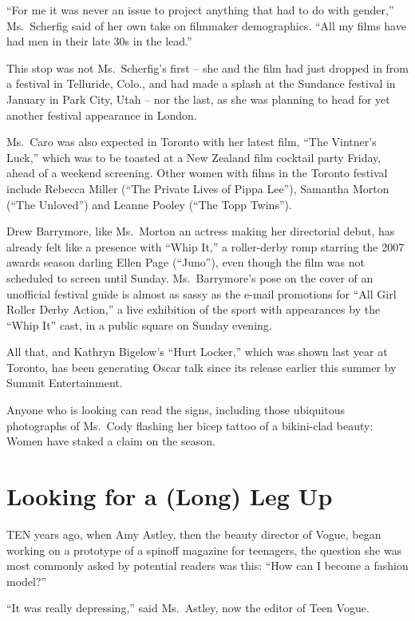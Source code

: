 ﻿\documentclass[12pt]{article}
\begin{document}
``For me it was never an issue to project anything that had to do with gender,'' Ms.~Scherfig said
of her own take on filmmaker demographics. ``All my films have had men in their late 30s in the
lead.''

This stop was not Ms.~Scherfig's first -- she and the film had just dropped in from a festival in
Telluride, Colo., and had made a splash at the Sundance festival in January in Park City, Utah --
nor the last, as she was planning to head for yet another festival appearance in London.

Ms.~Caro was also expected in Toronto with her latest film, ``The Vintner's Luck,'' which was to be
toasted at a New Zealand film cocktail party Friday, ahead of a weekend screening. Other women with
films in the Toronto festival include Rebecca Miller (``The Private Lives of Pippa Lee''), Samantha
Morton (``The Unloved'') and Leanne Pooley (``The Topp Twins'').

Drew Barrymore, like Ms.~Morton an actress making her directorial debut, has already felt like a
presence with ``Whip It,'' a roller-derby romp starring the 2007 awards season darling Ellen Page
(``Juno''), even though the film was not scheduled to screen until Sunday. Ms.~Barrymore's pose on
the cover of an unofficial festival guide is almost as sassy as the e-mail promotions for ``All Girl
Roller Derby Action,'' a live exhibition of the sport with appearances by the ``Whip It'' cast, in a
public square on Sunday evening.

All that, and Kathryn Bigelow's ``Hurt Locker,'' which was shown last year at Toronto, has been
generating Oscar talk since its release earlier this summer by Summit Entertainment.

Anyone who is looking can read the signs, including those ubiquitous photographs of Ms.~Cody
flashing her bicep tattoo of a bikini-clad beauty: Women have staked a claim on the season.

\section{Looking for a (Long) Leg Up}

\lettrine{T}{EN} years ago, when Amy Astley, then the beauty director of Vogue, began working on a
prototype of a spinoff magazine for teenagers, the question she was most commonly asked by potential
readers was this: ``How can I become a fashion model?''

``It was really depressing,'' said Ms.~Astley, now the editor of Teen Vogue.
\end{document}
